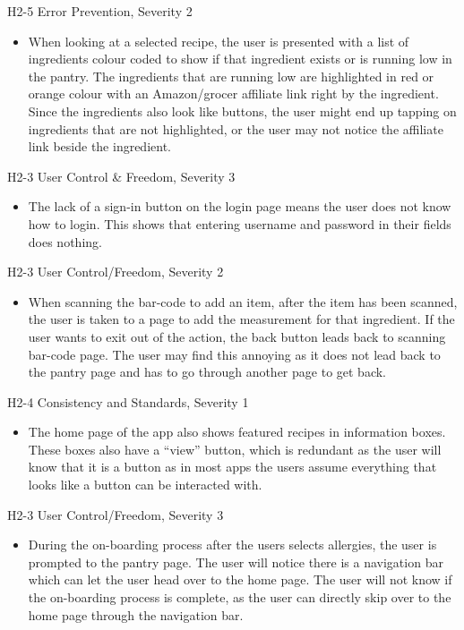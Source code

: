 \documentclass[manuscript, screen, nonacm]{acmart}
\begin{document}
H2-5 Error Prevention, Severity 2
\begin{itemize}
    \item When looking at a selected recipe, the user is presented with a list of ingredients colour coded to show if that ingredient exists or is running low in the pantry. The ingredients that are running low are highlighted in red or orange colour with an Amazon/grocer affiliate link right by the ingredient. Since the ingredients also look like buttons, the user might end up tapping on ingredients that are not highlighted, or the user may not notice the affiliate link beside the ingredient. 
\end{itemize}

H2-3 User Control \& Freedom, Severity 3
\begin{itemize}
    \item The lack of a sign-in button on the login page means the user does not know how to login. This shows that entering username and password in their fields does nothing.
\end{itemize}

H2-3 User Control/Freedom, Severity 2
\begin{itemize}
    \item When scanning the bar-code to add an item, after the item has been scanned, the user is taken to a page to add the measurement for that ingredient. If the user wants to exit out of the action, the back button leads back to scanning bar-code page. The user may find this annoying as it does not lead back to the pantry page and has to go through another page to get back.
\end{itemize}

H2-4 Consistency and Standards, Severity 1
\begin{itemize}
    \item The home page of the app also shows featured recipes in information boxes. These boxes also have a “view” button, which is redundant as the user will know that it is a button as in most apps the users assume everything that looks like a button can be interacted with. 
\end{itemize}

H2-3 User Control/Freedom, Severity 3
\begin{itemize}
    \item During the on-boarding process after the users selects allergies, the user is prompted to the pantry page. The user will notice there is a navigation bar which can let the user head over to the home page. The user will not know if the on-boarding process is complete, as the user can directly skip over to the home page through the navigation bar.
\end{itemize}
\end{document}
